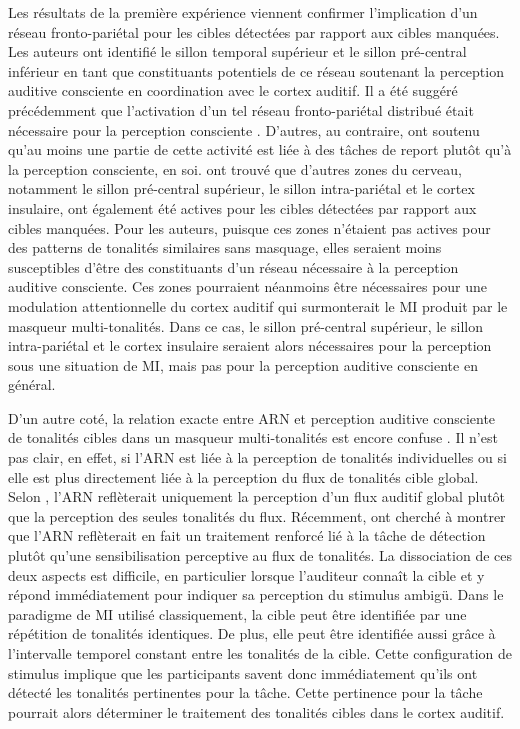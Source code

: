 Les résultats de la première expérience viennent confirmer l'implication d'un réseau fronto-pariétal pour les cibles détectées par rapport aux cibles manquées. 
Les auteurs ont identifié le sillon temporal supérieur et le sillon pré-central inférieur en tant que constituants potentiels de ce réseau soutenant la perception auditive consciente en coordination avec le cortex auditif. 
Il a été suggéré précédemment que l'activation d'un tel réseau fronto-pariétal distribué était nécessaire pour la perception consciente \citep{dehaene2011experimental, eriksson2007similar}. 
D'autres, au contraire, ont soutenu qu'au moins une partie de cette activité est liée à des tâches de report \citep{aru2012distilling, pitts2014gamma, peter2005visibility, tsuchiya2015no} plutôt qu'à la perception consciente, en soi. 
\cite{wiegand2018cortical} ont trouvé que d'autres zones du cerveau, notamment le sillon pré-central supérieur, le sillon intra-pariétal et le cortex insulaire, ont également été actives pour les cibles détectées par rapport aux cibles manquées. 
Pour les auteurs, puisque ces zones n'étaient pas actives pour des patterns de tonalités similaires sans masquage, elles seraient moins susceptibles d'être des constituants d'un réseau nécessaire à la perception auditive consciente. 
Ces zones pourraient néanmoins être nécessaires pour une modulation attentionnelle du cortex auditif qui surmonterait le MI produit par le masqueur multi-tonalités. 
Dans ce cas, le sillon pré-central supérieur, le sillon intra-pariétal et le cortex insulaire seraient alors nécessaires pour la perception sous une situation de MI, mais pas pour la perception auditive consciente en général.

D'un autre coté, la relation exacte entre ARN et perception auditive consciente de tonalités cibles dans un masqueur multi-tonalités est encore confuse \citep{dykstra2017electrophysiological, snyder2015testing}. 
Il n'est pas clair, en effet, si l'ARN est liée à la perception de tonalités individuelles ou si elle est plus directement liée à la perception du flux de tonalités cible global. 
Selon \cite{giani2015detecting}, l'ARN reflèterait uniquement la perception d'un flux auditif global plutôt que la perception des seules tonalités du flux. 
Récemment, \cite{gartner2021auditory} ont cherché à montrer que l'ARN reflèterait en fait un traitement renforcé lié à la tâche de détection plutôt qu'une sensibilisation perceptive au flux de tonalités. 
La dissociation de ces deux aspects est difficile, en particulier lorsque l'auditeur connaît la cible et y répond immédiatement pour indiquer sa perception du stimulus ambigü. 
Dans le paradigme de MI utilisé classiquement, la cible peut être identifiée par une répétition de tonalités identiques. 
De plus, elle peut être identifiée aussi grâce à l'intervalle temporel constant entre les tonalités de la cible. 
Cette configuration de stimulus implique que les participants savent donc immédiatement qu'ils ont détecté les tonalités pertinentes pour la tâche. 
Cette pertinence pour la tâche pourrait alors déterminer le traitement des tonalités cibles dans le cortex auditif. 

